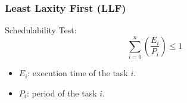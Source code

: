 \documentclass[xcolor=table]{beamer}
\begin{document}
\begin{frame}
\frametitle{Least Laxity First (\textbf{LLF})}

\begin{block}{Schedulability Test:}
\begin{equation}
\sum_{i=0}^{n} \left( \frac{E_i}{P_i} \right) \leq 1
\end{equation}

\begin{itemize}
    \item $E_i$: execution time of the task $i$.
    \item $P_i$: period of the task $i$.
\end{itemize}
\end{block}

\end{frame}
\end{document}
